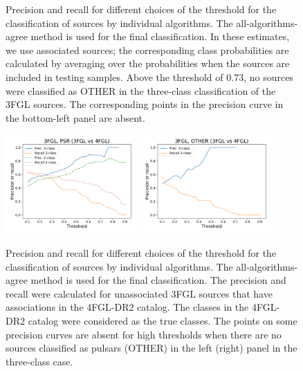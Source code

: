 \documentclass[referee]{aa} %
\begin{document}
\begin{appendix}
\begin{figure}[h!]
\caption{Precision and recall for different choices of the threshold for the classification of sources by individual algorithms.
The all-algorithms-agree method is used for the final classification. 
In these estimates, we use associated sources; the corresponding class probabilities are calculated by averaging over the probabilities when the sources are included in testing samples. Above the threshold of 0.73, no sources were classified as OTHER in the three-class classification of the 3FGL sources. The corresponding points in the precision curve in the bottom-left panel are absent.
}
\label{fig:thres}
\end{figure}


\begin{figure}[h!]
\centering
\includegraphics[width=0.45\textwidth]{plots/thresholds/thresholds_prec_recall_3FGL_vs_4FGL-DR2_PSR.pdf}
\includegraphics[width=0.45\textwidth]{plots/thresholds/thresholds_prec_recall_3FGL_vs_4FGL-DR2_OTHER.pdf}
\caption{Precision and recall for different choices of the threshold for the classification of sources by individual algorithms.
The all-algorithms-agree method is used for the final classification. 
The precision and recall were calculated for unassociated 3FGL sources that have associations in the 4FGL-DR2 catalog.
The classes in the 4FGL-DR2 catalog were considered as the true classes.
The points on some precision curves are absent for high thresholds when there are no sources classified as pulsars (OTHER) in the left (right) panel in the three-class case.
}
\label{fig:thres_3_vs_4}
\end{figure}


\end{appendix}
\end{document}

